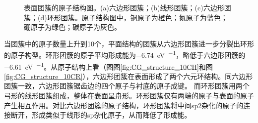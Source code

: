 \begin{figure}[htb]
{            \label{fig:CG_structure_10CR}
        }
        \caption{表面团簇的原子结构图。(a)六边形团簇；(b)线形团簇；(c)六边形团簇；(d)环形团簇。原子结构图中，铜原子为橙色；氮原子为蓝色；硼原子为绿色；碳原子为灰色。}
        \label{fig:CG_CG_structure_6-10C}
    \end{figure}

    当团簇中的原子数量上升到10个，平面结构的团簇从六边形团簇进一步分裂出环形的原子构型。环形团簇的原子平均形成能为\SI{-6.74}{\electronvolt\per\atom}，略低于六边形团簇的\SI{-6.61}{\electronvolt\per\atom}。从原子结构上看（图图\ref{fig:CG_structure_10CH}和图\ref{fig:CG_structure_10CR}），六边形团簇在表面形成了两个六元环结构。同六边形团簇一致，六边形团簇锯齿边的四个原子与衬底的原子成键。
    而环形团簇用两个弓形的线形团簇组成，整体在表面呈舟形。环形团簇仅有两端的原子与表面的原子产生相互作用。对比六边形团簇的原子结构，环形团簇将中间sp2杂化的原子的连接断开，形成类似于线形的sp杂化原子，从而降低了形成能。
    
